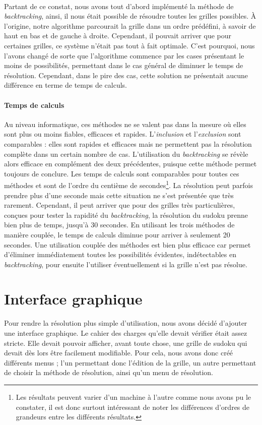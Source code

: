 \documentclass[12pt,a4paper]{report}
\begin{document}
\paragraph{} Partant de ce constat, nous avons tout d'abord implémenté la méthode de \emph{backtracking}, ainsi, il nous était possible de résoudre toutes les grilles possibles. \`{A} l'origine, notre algorithme parcourait la grille dans un ordre prédéfini, à savoir de haut en bas et de gauche à droite. Cependant, il pouvait arriver que pour certaines grilles, ce système n'était pas tout à fait optimale. C'est pourquoi, nous l'avons changé de sorte que l'algorithme commence par les cases présentant le moins de possibilités, permettant dans le cas général de diminuer le temps de résolution. Cependant, dans le pire des cas, cette solution ne présentait aucune différence en terme de temps de calculs. 

\paragraph{Temps de calculs} Au niveau informatique, ces méthodes ne se valent pas dans la mesure où elles sont plus ou moins fiables, efficaces et rapides. L'\emph{inclusion} et l'\emph{exclusion} sont comparables : elles sont rapides et efficaces mais ne permettent pas la résolution complète dans un certain nombre de cas. L'utilisation du \emph{backtracking} se révèle alors efficace en complément des deux précédentes, puisque cette méthode permet toujours de conclure. Les temps de calculs sont comparables pour toutes ces méthodes et sont de l'ordre du centième de secondes\footnote{Les résultats peuvent varier d'un machine à l'autre comme nous avons pu le constater, il est donc surtout intéressant de noter les différences d'ordres de grandeurs entre les différents résultats.}. La résolution peut parfois prendre plus d'une seconde mais cette situation ne s'est présentée que très rarement. Cependant, il peut arriver que pour des grilles très particulières, conçues pour tester la rapidité du \emph{backtracking}, la résolution du sudoku prenne bien plus de temps, jusqu'à 30 secondes. En utilisant les trois méthodes de manière couplée, le temps de calculs diminue pour arriver à seulement 20 secondes. Une utilisation couplée des méthodes est bien plus efficace car permet d'éliminer immédiatement toutes les possibilités évidentes, indétectables en \emph{backtracking}, pour ensuite l'utiliser éventuellement si la grille n'est pas résolue.

\newpage
\section{Interface graphique}
Pour rendre la résolution plus simple d'utilisation, nous avons décidé d'ajouter une interface graphique. Le cahier des charges qu'elle devait vérifier était assez stricte. Elle devait pouvoir afficher, avant toute chose, une grille de sudoku qui devait dès lors être facilement modifiable. Pour cela, nous avons donc créé différents menus ; l'un permettant donc l'édition de la grille, un autre permettant de choisir la méthode de résolution, ainsi qu'un menu de résolution. 
\end{document}
